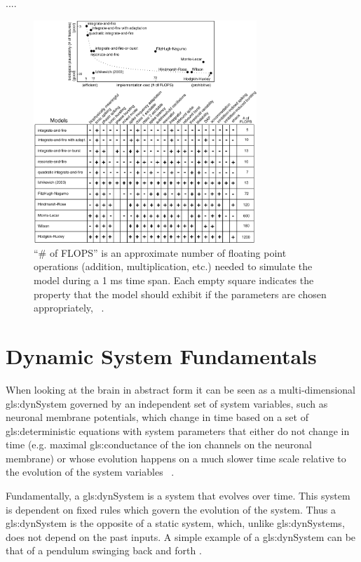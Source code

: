 \documentclass[../../Orator.tex]{subfiles}
\begin{document}
....


\begin{figure}[H]
    \centering
    \includegraphics[width = 0.75\textwidth]{Pictures/Kenni/properties_spiking_bursting_models_all.png}
    \caption{“\# of FLOPS” is an approximate number of floating point operations (addition, multiplication, etc.) needed to simulate the model during a 1 ms time span. Each empty square indicates the property that the model should exhibit if the parameters are chosen appropriately, ~\cite{izhikevich2004model}.}
    \label{fig:computational_properties}
\end{figure}






\section{Dynamic System Fundamentals}
When looking at the brain in abstract form it can be seen as a multi-dimensional \gls{gls:dynSystem} governed by an independent set of system variables, such as neuronal membrane potentials, which change in time based on a set of \gls{gls:deterministic} equations with system parameters that either do not change in time (e.g. maximal \gls{gls:conductance} of the ion
channels on the neuronal membrane) or whose evolution happens on a much slower time scale relative to the evolution of the system variables ~\cite{STEFANESCU2012748}.


Fundamentally, a \gls{gls:dynSystem} is a system that evolves over time. This system is dependent on fixed rules which govern the evolution of the system. Thus a \gls{gls:dynSystem} is the opposite of a static system, which, unlike \gls{gls:dynSystem}s, does not depend on the past inputs. A simple example of a \gls{gls:dynSystem} can be that of a pendulum swinging back and forth \cite{}. 
\end{document}

